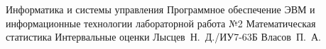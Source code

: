 \documentclass{bmstu}
\begin{document}
\makereporttitle
{Информатика и системы управления} %
{Программное обеспечение ЭВМ и информационные технологии}
{лабораторной работа №2} %
{Математическая статистика} %
{Интервальные оценки} %
{} %
{Лысцев~Н.~Д./ИУ7-63Б} %
{Власов~П.~А.} %
{}

\maketableofcontents



%


%

\end{document}
